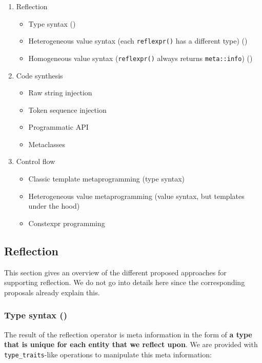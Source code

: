\documentclass{wg21}
\newcommand{\cc}[1]{\texttt{#1}}
\begin{document}
\begin{enumerate}
  \item Reflection
    \begin{itemize}
      \item Type syntax (\cite{P0194})
      \item Heterogeneous value syntax (each \cc{reflexpr()} has a different type) (\cite{P0590})
      \item Homogeneous value syntax (\cc{reflexpr()} always returns \cc{meta::info}) (\cite{P0598})
    \end{itemize}

  \item Code synthesis
    \begin{itemize}
      \item Raw string injection
      \item Token sequence injection
      \item Programmatic API
      \item Metaclasses
    \end{itemize}

  \item Control flow
    \begin{itemize}
      \item Classic template metaprogramming (type syntax)
      \item Heterogeneous value metaprogramming (value syntax, but templates under the hood)
      \item Constexpr programming
    \end{itemize}
\end{enumerate}


\subsection{Reflection}
This section gives an overview of the different proposed approaches for
supporting reflection. We do not go into details here since the corresponding
proposals already explain this.

\subsubsection{Type syntax (\cite{P0194})}
The result of the reflection operator is meta information in the form of
\textbf{a type that is unique for each entity that we reflect upon}. We
are provided with \cc{type_traits}-like operations to manipulate this meta
information:
\end{document}
